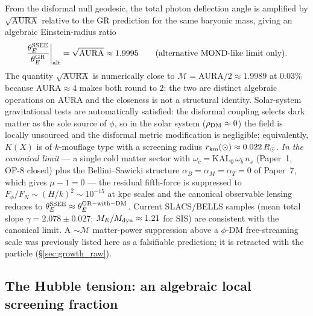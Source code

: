 \documentclass[12pt,a4paper]{article}
\newcommand{\MIRA}{\mathcal{M}}
\newcommand{\AURA}{\mathrm{AURA}}
\newcommand{\thetaE}{\theta_E}
\begin{document}
From the disformal null geodesic, the total photon deflection angle is amplified
by $\sqrt{\AURA}$ relative to the GR prediction for the same baryonic mass,
giving an algebraic Einstein-radius ratio
\begin{equation}
\left.\frac{\theta_E^{\rm SSEE}}{\theta_E^{\rm GR}}\right|_{\rm alt}
   = \sqrt{\AURA}\approx 1.9995
   \qquad\text{(alternative MOND-like limit only).}
\end{equation}
The quantity $\sqrt{\AURA}$ is numerically close to $\MIRA=\AURA/2\approx 1.9989$
at $0.03\%$ because $\AURA\approx 4$ makes both round to $2$; the two are
distinct algebraic operations on $\AURA$ and the closeness is not a structural
identity. Solar-system gravitational tests are automatically satisfied: the
disformal coupling selects dark matter as the sole source of $\phi$, so in the
solar system ($\rho_{\rm DM}\approx 0$) the field is locally unsourced and the
disformal metric modification is negligible; equivalently, $K(X)$ is of
$k$-mouflage type \citep{BraxValageas2014} with a screening radius
$r_{\rm km}(\odot)\approx 0.022\,R_\odot$.
\emph{In the canonical limit} --- a single cold matter sector with
$\omega_c = \mathrm{KAL}_0\,\omega_b\,n_s$ (Paper~1, OP-8 closed) plus the
Bellini--Sawicki structure $\alpha_B=\alpha_M=\alpha_T=0$ of Paper~7, which
gives $\mu-1=0$ --- the residual fifth-force is
suppressed to $F_\phi/F_N\sim(H/k)^2\sim 10^{-15}$ at kpc scales and the
canonical observable lensing reduces to $\thetaE^{\rm SSEE}\approx
\thetaE^{\rm GR-with-DM}$. Current SLACS/BELLS samples (mean total slope
$\gamma=2.078\pm 0.027$; $M_E/M_{\rm dyn}\approx 1.21$ for SIS) are consistent
with the canonical limit. A $\sim\MIRA$ matter-power suppression above a $\phi$-DM free-streaming scale
was previously listed here as a falsifiable prediction; it is retracted with the
particle (\S\ref{sec:growth_raw}).

\subsection{The Hubble tension: an algebraic local screening fraction}
\label{sec:ext-ht}
\end{document}
